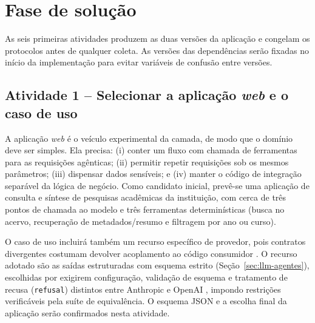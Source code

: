 \begin{figure}[h!]
{
  }{
  }
\end{figure}

\section{Fase de solução}
\label{sec:fase-solucao}

As seis primeiras atividades produzem as duas versões da aplicação e congelam os
protocolos antes de qualquer coleta. As versões das dependências serão fixadas
no início da implementação para evitar variáveis de confusão entre versões.

\subsection{Atividade 1 -- Selecionar a aplicação \textit{web} e o caso de uso}
\label{subsec:at-aplicacao}

A aplicação \textit{web} é o veículo experimental da camada, de modo que o
domínio deve ser simples. Ela precisa: (i) conter um fluxo com chamada de
ferramentas para as requisições agênticas; (ii) permitir repetir requisições sob
os mesmos parâmetros; (iii) dispensar dados sensíveis; e (iv) manter o código de
integração separável da lógica de negócio. Como candidato inicial, prevê-se uma
aplicação de consulta e síntese de pesquisas acadêmicas da instituição, com
cerca de três pontos de chamada ao modelo e três ferramentas determinísticas
(busca no acervo, recuperação de metadados/resumo e filtragem por ano ou curso).

O caso de uso incluirá também um recurso específico de provedor, pois contratos
divergentes costumam devolver acoplamento ao código consumidor
\cite{thoughtworkslitellm}. O recurso adotado são as saídas estruturadas com
esquema estrito (Seção~\ref{sec:llm-agentes}), escolhidas por exigirem
configuração, validação de esquema e tratamento de recusa (\texttt{refusal})
distintos entre Anthropic e OpenAI \cite{anthropicstructured,openaistructured},
impondo restrições verificáveis pela suíte de equivalência. O esquema JSON e a
escolha final da aplicação serão confirmados nesta atividade.

